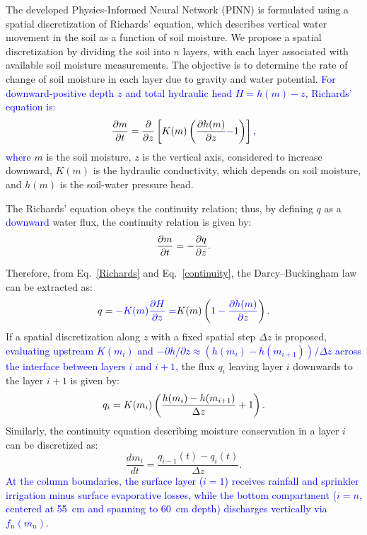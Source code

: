 \documentclass[pdflatex,sn-nature]{sn-jnl}%
\theoremstyle{thmstyleone}%
\theoremstyle{thmstyletwo}%
\theoremstyle{thmstylethree}%
\begin{document}
The developed Physics-Informed Neural Network (PINN) is formulated using a spatial discretization of Richards' equation, which describes vertical water movement in the soil as a function of soil moisture. We propose a spatial discretization by dividing the soil into $n$ layers, with each layer associated with available soil moisture measurements. The objective is to determine the rate of change of soil moisture in each layer due to gravity and water potential. \textcolor{blue}{For downward-positive depth $z$ and total hydraulic head $H = h(m) - z$, Richards' equation is:}
\begin{equation}
\frac{\partial m}{\partial t} = \frac{\partial }{\partial z}\left[ K(m)\left(\frac{\partial h(m)}{\partial z} \textcolor{blue}{-} 1\right)\right]\textcolor{blue}{,}
\label{Richards}
\end{equation}
\textcolor{blue}{where} $m$ is the soil moisture, $z$ is the vertical axis, considered to increase downward, $K(m)$ is the hydraulic conductivity, which depends on soil moisture, and $h(m)$ is the soil-water pressure head.

The Richards' equation obeys the continuity relation; thus, by defining $q$ as a \textcolor{blue}{downward} water flux, the continuity relation is given by:
\begin{equation}
\frac{\partial m}{\partial t} = -\frac{\partial q}{\partial z}\textcolor{blue}{.}
\label{continuity}
\end{equation}

Therefore, from Eq.~\textcolor{blue}{\eqref{Richards}} and Eq.~\textcolor{blue}{\eqref{continuity}}, the Darcy--Buckingham law can be extracted as:
\begin{equation}
q = \textcolor{blue}{-K(m)\frac{\partial H}{\partial z} =} K(m)\left(\textcolor{blue}{1 - \frac{\partial h(m)}{\partial z}}\right)\textcolor{blue}{.}
\label{eq:darcy}
\end{equation}
If a spatial discretization along $z$ with a fixed spatial step $\Delta z$ is proposed, \textcolor{blue}{evaluating upstream $K(m_i)$ and $-\partial h/\partial z \approx (h(m_i)-h(m_{i+1}))/\Delta z$ across the interface between layers $i$ and $i+1$,} the flux $q_i$ leaving layer $i$ downwards to the layer $i+1$ is given by:
\begin{equation}
q_i = K(m_i)\left(\frac{h(m_i)-h(m_{i+1})}{\Delta z}+1\right)\textcolor{blue}{.}
\label{eq:flux_disc}
\end{equation}
Similarly, the continuity equation describing moisture conservation in a layer $i$ can be discretized as:
\begin{equation}
\frac{d m_i}{d t} = \frac{q_{i-1}(t)-q_i(t)}{\Delta z}.
\label{eq:cont_disc}
\end{equation}
\textcolor{blue}{At the column boundaries, the surface layer ($i=1$) receives rainfall and sprinkler irrigation minus surface evaporative losses, while the bottom compartment ($i=n$, centered at \SI{55}{cm} and spanning to \SI{60}{cm} depth) discharges vertically via $f_n(m_n)$.}
\end{document}

